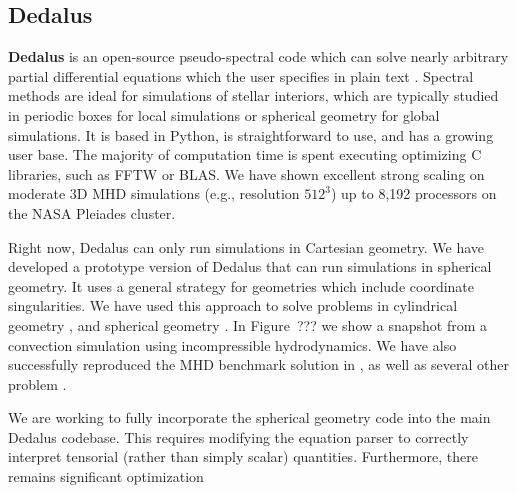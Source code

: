 {\color{purple}    
\subsection{Dedalus}}

\textbf{Dedalus} is an open-source pseudo-spectral code which can solve nearly arbitrary partial differential equations which the user specifies in plain text \citep[][source code at: dedalus-project.org]{Burns2016}. Spectral methods are ideal for simulations of stellar interiors, which are typically studied in periodic boxes for local simulations or spherical geometry for global simulations. It is based in Python, is straightforward to use, and has a growing user base. The majority of computation time is spent executing optimizing C libraries, such as FFTW or BLAS. We have shown excellent strong scaling on moderate 3D MHD simulations (e.g., resolution $512^3$) up to 8,192 processors on the NASA Pleiades cluster.

Right now, Dedalus can only run simulations in Cartesian geometry. We have developed a prototype version of Dedalus that can run simulations in spherical geometry. It uses a general strategy for geometries which include coordinate singularities. We have used this approach to solve problems in cylindrical geometry \cite{Vasil_2016}, and spherical geometry \citep[][submitted to JCP]{p}. In Figure~??? we show a snapshot from a convection simulation using incompressible hydrodynamics. We have also successfully reproduced the MHD benchmark solution in \cite{Marti_2014}, as well as several other problem \citep{s}.

We are working to fully incorporate the spherical geometry code into the main Dedalus codebase. This requires modifying the equation parser to correctly interpret tensorial (rather than simply scalar) quantities. Furthermore, there remains significant optimization 
